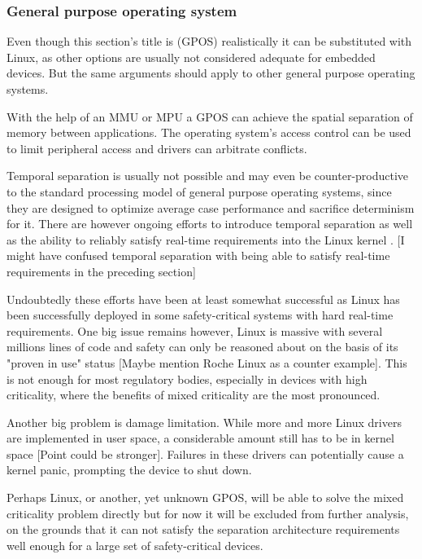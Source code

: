\subsubsection{General purpose operating system}
Even though this section's title is  (GPOS) realistically it can be substituted with Linux, as other options are usually not considered adequate for embedded devices. But the same arguments should apply to other general purpose operating systems.

With the help of an \gls{MMU} or \gls{MPU}  a \gls{GPOS} can achieve the spatial separation of memory between applications. The operating system's access control can be used to limit peripheral access and drivers can arbitrate conflicts. 

Temporal separation is usually not possible and may even be counter-productive to the standard processing model of general purpose operating systems, since they are designed to optimize average case performance and sacrifice determinism for it. There are however ongoing efforts to introduce temporal separation as well as the ability to reliably satisfy real-time requirements into the Linux kernel \cite{SiroArthur.2007}.
[I might have confused temporal separation with being able to satisfy real-time requirements in the preceding section]

Undoubtedly these efforts have been at least somewhat successful as Linux has been successfully deployed in some safety-critical systems with hard real-time requirements. One big issue remains however, Linux is massive with several millions lines of code and safety can only be reasoned about on the basis of its "proven in use" status [Maybe mention Roche Linux as a counter example]. This is not enough for most regulatory bodies, especially in devices with high criticality, where the benefits of mixed criticality are the most pronounced.

Another big problem is damage limitation. While more and more Linux drivers are implemented in user space, a considerable amount still has to be in kernel space [Point could be stronger]. Failures in these drivers can potentially cause a kernel panic, prompting the device to shut down. 

Perhaps Linux, or another, yet unknown GPOS, will be able to solve the mixed criticality problem directly but for now it will be excluded from further analysis, on the grounds that it can not satisfy the separation architecture requirements well enough for a large set of safety-critical devices.
